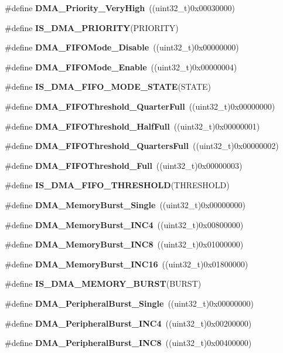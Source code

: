 \begin{DoxyCompactItemize}
\item 
\#define \textbf{ D\+M\+A\+\_\+\+Priority\+\_\+\+Very\+High}~((uint32\+\_\+t)0x00030000)
\item 
\#define \textbf{ I\+S\+\_\+\+D\+M\+A\+\_\+\+P\+R\+I\+O\+R\+I\+TY}(P\+R\+I\+O\+R\+I\+TY)
\item 
\#define \textbf{ D\+M\+A\+\_\+\+F\+I\+F\+O\+Mode\+\_\+\+Disable}~((uint32\+\_\+t)0x00000000)
\item 
\#define \textbf{ D\+M\+A\+\_\+\+F\+I\+F\+O\+Mode\+\_\+\+Enable}~((uint32\+\_\+t)0x00000004)
\item 
\#define \textbf{ I\+S\+\_\+\+D\+M\+A\+\_\+\+F\+I\+F\+O\+\_\+\+M\+O\+D\+E\+\_\+\+S\+T\+A\+TE}(S\+T\+A\+TE)
\item 
\#define \textbf{ D\+M\+A\+\_\+\+F\+I\+F\+O\+Threshold\+\_\+Quarter\+Full}~((uint32\+\_\+t)0x00000000)
\item 
\#define \textbf{ D\+M\+A\+\_\+\+F\+I\+F\+O\+Threshold\+\_\+\+Half\+Full}~((uint32\+\_\+t)0x00000001)
\item 
\#define \textbf{ D\+M\+A\+\_\+\+F\+I\+F\+O\+Threshold\+\_\+Quarters\+Full}~((uint32\+\_\+t)0x00000002)
\item 
\#define \textbf{ D\+M\+A\+\_\+\+F\+I\+F\+O\+Threshold\+\_\+\+Full}~((uint32\+\_\+t)0x00000003)
\item 
\#define \textbf{ I\+S\+\_\+\+D\+M\+A\+\_\+\+F\+I\+F\+O\+\_\+\+T\+H\+R\+E\+S\+H\+O\+LD}(T\+H\+R\+E\+S\+H\+O\+LD)
\item 
\#define \textbf{ D\+M\+A\+\_\+\+Memory\+Burst\+\_\+\+Single}~((uint32\+\_\+t)0x00000000)
\item 
\#define \textbf{ D\+M\+A\+\_\+\+Memory\+Burst\+\_\+\+I\+N\+C4}~((uint32\+\_\+t)0x00800000)
\item 
\#define \textbf{ D\+M\+A\+\_\+\+Memory\+Burst\+\_\+\+I\+N\+C8}~((uint32\+\_\+t)0x01000000)
\item 
\#define \textbf{ D\+M\+A\+\_\+\+Memory\+Burst\+\_\+\+I\+N\+C16}~((uint32\+\_\+t)0x01800000)
\item 
\#define \textbf{ I\+S\+\_\+\+D\+M\+A\+\_\+\+M\+E\+M\+O\+R\+Y\+\_\+\+B\+U\+R\+ST}(B\+U\+R\+ST)
\item 
\#define \textbf{ D\+M\+A\+\_\+\+Peripheral\+Burst\+\_\+\+Single}~((uint32\+\_\+t)0x00000000)
\item 
\#define \textbf{ D\+M\+A\+\_\+\+Peripheral\+Burst\+\_\+\+I\+N\+C4}~((uint32\+\_\+t)0x00200000)
\item 
\#define \textbf{ D\+M\+A\+\_\+\+Peripheral\+Burst\+\_\+\+I\+N\+C8}~((uint32\+\_\+t)0x00400000)
\item 

\end{DoxyCompactItemize}
